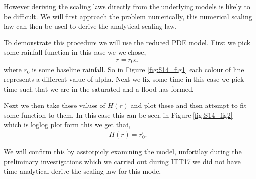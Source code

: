 \documentclass[11pt]{article}
\begin{document}
\noindent\begin{minipage}{0.53\textwidth}
    \qquad However deriving the scaling laws directly from the underlying models is likely to be difficult. We will first approach the problem numerically, this numerical scaling law can then be used to derive the analytical scaling law.
    
    \qquad To demonstrate this procedure we will use the reduced PDE model. First we pick some rainfall function in this case we we chose, \begin{align}
        r = r_0\epsilon,
    \end{align}
    where $r_0$ is some baseline rainfall. So in Figure \ref{fig:S14_fig1} each colour of line represents a different value of alpha. Next we fix some time in this case we pick time such that we are in the saturated and a flood has formed. 
    
    \qquad Next we then take these values of $H(r)$ and plot these and then attempt to fit some function to them. In this case this can be seen in Figure \ref{fig:S14_fig2} which is loglog plot form this we get that, \begin{align}
    H(r)=r_0^{\epsilon}.
    \end{align}
    
    \qquad We will confirm this by asstotpicly examining the model, unfortilay during the preliminary investigations which we carried out during ITT17 we did not have time analytical derive the scaling law for this model
    \end{minipage}
\hspace{0.05\textwidth}
\end{document}
